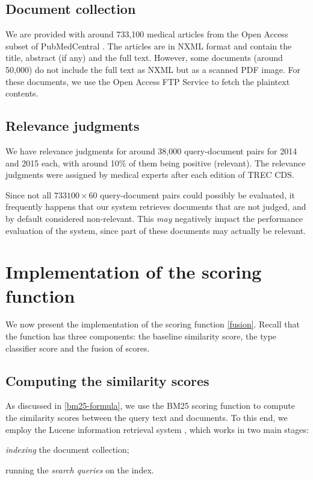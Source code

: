 \subsection{Document collection}
We are provided with around 733,100 medical articles from the Open Access subset of PubMedCentral \cite{oa}. The articles are in NXML format
and contain the title, abstract (if any) and the full text. However, some documents (around 50,000) do not include the full text
as NXML but as a scanned PDF image. For these documents, we use the Open Access FTP Service \cite{oa-ftp} to fetch the plaintext contents.

\subsection{Relevance judgments}\label{qrels}
We have relevance judgments for around 38,000 query-document pairs for 2014 and 2015 each, with around 10\% of them
being positive (relevant). The relevance judgments were assigned by medical experts after each edition of TREC CDS.

Since not all $733100\times 60$ query-document pairs could possibly be evaluated, it frequently happens that our system retrieves documents
that are not judged, and by default considered non-relevant. This \emph{may} negatively impact the performance evaluation of
the system, since part of these documents may actually be relevant.

\section{Implementation of the scoring function}
We now present the implementation of the scoring function \ref{fusion}. Recall that the function has three components:
the baseline similarity score, the type classifier score and the fusion of scores.

\subsection{Computing the similarity scores}\label{sim-impl}
As discussed in \ref{bm25-formula}, we use the \textsf{BM25} scoring function to compute the similarity scores between the query
text and documents. To this end, we employ the Lucene information retrieval system \cite{lucene}, which works in two main stages:
\begin{enumerate*}[label=\arabic*)]
 \item \emph{indexing} the document collection;
 \item running the \emph{search queries} on the index. 
\end{enumerate*}

